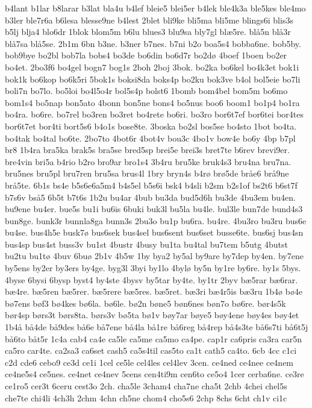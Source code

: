 {b4lant
b1lar
b8larar
b3lat
bla4u
b4lef
bleie5
blei5er
b4lek
ble4k3a
ble5kes
ble4mo
b3ler
ble7r6a
b6lesa
blesse9ne
b4lest
2blet
bli9ke
bli5ma
bli5me
blings6i
blis3s
b5lj
blja4
blo6dr
1blok
blom5m
b6lu
blues3
blu9sa
bly7gl
blæ5re.
blå5n
blå3r
blå7sa
blå5se.
2b1m
6bn
b3ne.
b3ner
b7nes.
b7ni
b2o
boa5s4
bobba6ne.
bob5by.
bob9bye
bo2bl
bob7la
bobs4
bo3de
bo6din
bo6d7r
bo2dø
4boef
1boen
bo2er
bo4et.
2bo3f6
bo4gel
bogn7
bog1s
2boh
2boj
3bok.
bo2ka
bo6kel
bo4k3et
bok1i
bok1k
bo6kop
bo6k5ri
5bok1s
boksi8da
boks4p
bo2ku
bok3ve
b4ol
bol5eie
bo7li
boli7n
bo7lo.
bo5loi
bo4l5o4r
bol5s4p
bolst6
1bomb
bom4bel
bom5m
bo6mo
bom1s4
bo5nap
bon5ato
4bonn
bon5ne
bons4
bo5nus
boo6
boom1
bo1p4
bo1ra
bo4ra.
bo6re.
bo7rel
bo3ren
bo3ret
bo4rete
bo6ri.
bo3ro
bor6t7ef
bor6tei
bor4tes
bor6t7et
bor4ti
bort5s6
b4o1s
bose8te.
3boska
bo2sl
bos5se
bo4sto
1bot
bo4ta.
bo4tak
bo4tal
bo6te.
2bo7to
4bot6r
4bot4v
bou3c
4bo1v
bow4e
bo6y
4bp
b7pl
br8
1b4ra
bra5ka
brak5s
bra5se
bred5sp
brei5e
brei3s
bret7te
b6rev
brevi9er.
bre4vin
bri5a
b4rio
b2ro
bro9ar
bro1s4
3b4ru
bru5ke
bruk4s3
bru4na
bru7na.
bru5nes
bru5pl
bru7ren
bru5sa
brus4l
1bry
bryn4s
b4rø
brø5de
bråe6
brå9ne
brå5te.
6b1s
bs4e
b5s6e6a5m4
b4s5el
b5s6i
bsk4
b4sli
b2sm
b2s1of
bs2t6
b6st7f
b7s6v
bså5
6b5t
b7t6s
1b2u
bu4ar
4bub
bu3da
bud5d6h
bu3de
4bu3em
bu4en.
bu9ene
bu4er.
bue5s
bu1i
bu6is
6buki
buk3l
bu5la
bu4le.
bul3le
bun7de
bund4s3
bun8ge.
bunk3r
bunnla8ga
bunn3s
2bu3o
bu1p
bu6ra.
bu4re.
4bu3ro
bu3ru
bus6e
bu4se.
bus4h5e
busk7ø
bus6sek
bus4sel
bus6sent
bus6set
busse6te.
bus6sj
bus4sn
bus4sp
bus4st
buss3v
bu1st
4bustr
4busy
bu1ta
bu4tal
bu7tem
b5utg
4butst
bu2tu
bu1tø
4buv
6buø
2b1v
4b5w
1by
bya2
by5al
by9are
by7dep
by4en.
by7ene
by5ens
by2er
by3ers
by4ge.
byg3l
3byi
by1lo
4bylø
by5n
by1re
by6re.
by1s
5bys.
4byse
6bysi
6bysp
byst4
by4ste
4bysv
by5tar
by4te.
by1tr
2byv
bæ5rar
bæ6rar.
bæ4re.
bæ5ren
bæ5rer.
bæ5rere
bæ5res.
bæ5ret.
bæ3ri
bæ4r5is
bæ3ru
1b4ø
bø4e
bø7ens
bøf3
bø4kes
bø6la.
bø6le.
bø2n
bøne5
bøn6nes
bøn7o
bø6re.
bør4s5k
bør4sp
børs3t
børs8ta.
børs3v
bø5ta
bø1v
bøy7ar
bøye5
bøy4ene
bøy4es
bøy4et
1b4å
bå4de
bå9des
bå6e
bå7ene
bå4la
bå1re
bå6reg
bå4rep
bå4s3te
bå6s7ti
bå6t5j
bå6to
båt5r
1c4a
cab4
ca4e
ca5le
ca5me
ca5mo
ca4pe.
cap1r
ca6pris
ca3ra
car5n
ca5ro
car4te.
ca2sa3
ca6set
cash5
ca5s4til
cas5to
ca1t
cath5
ca4to.
6cb
4cc
c1ci
c2d
cde6
cebo9
ce3d
ce1i
1cel
ce5le
cel4les
cel4lev
3cen.
ce4ned
ce4nee
ce4nem
ce4ne5s4
ce5nes.
ce4net
ce4nev
5cens
cen4ti9m
cen6to
ce5o4
1cer
cerba6ne.
ce3re
ce1ro5
cer3t
6ceru
cest3o
2ch.
cha5le
3cham4
cha7ne
cha5t
2chb
4chei
chel5s
che7te
chi4li
4ch3h
2chm
4chn
ch5ne
chom4
cho5s6
2chp
8chs
6cht
ch1v
ci1c
}
